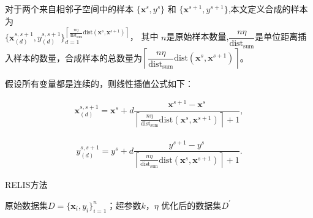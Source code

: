 \documentclass[12pt,a4paper]{article}%
\begin{document}
	对于两个来自相邻子空间中的样本 $\{\boldsymbol{x}^s,y^s\}$ 和 $\{\boldsymbol{x}^{s+1},y^{s+1}\}$,本文定义合成的样本为\\
	$\{\boldsymbol{x}_{(d)}^{s,s+1},y_{(d)}^{s,s+1} \}_{d=1}^{\left\lceil \frac{n\eta }{\text{dist}_{\text{sum}}}\text{dist}(\boldsymbol{x}^s,\boldsymbol{x}^{s+1})\right\rceil}$，
	其中 $n$是原始样本数量,$\dfrac{n\eta}{\text{dist}_{\text{sum}}}$是单位距离插入样本的数量，合成样本的总数量为$\left\lceil \dfrac{n\eta}{\text{dist}_{\text{sum}}}\text{dist}(\boldsymbol{x}^s,\boldsymbol{x}^{s+1})\right\rceil$。

	假设所有变量都是连续的，则线性插值公式如下：

	\begin{align}
		\boldsymbol{x}^{s,s+1}_{(d)}=\boldsymbol{x}^s+d\dfrac{\boldsymbol{x}^{s+1}-\boldsymbol{x}^{s}}{\left\lceil \frac{n\eta}{\text{dist}_{\text{sum}}}\text{dist}(\boldsymbol{x}^s,\boldsymbol{x}^{s+1})\right\rceil+1},
		\end{align}

	\begin{align}
		y^{s,s+1}_{(d)}=y^s+d\dfrac{y^{s+1}-y^{s}}{\left\lceil \frac{n\eta}{\text{dist}_{\text{sum}}}\text{dist}(\boldsymbol{x}^s,\boldsymbol{x}^{s+1})\right\rceil+1}.
		\end{align}

		\begin{algorithm}[t!]
			\caption{RELIS方法}
			\label{a3}
			\renewcommand{\algorithmicrequire}{\textbf{输入:}}
			\renewcommand{\algorithmicensure}{\textbf{输出:}}
			\begin{algorithmic}[1]
				\REQUIRE 原始数据集$D=\{\boldsymbol{x}_i,y_i \}_{i=1}^n$；超参数$k$，$\eta$
				\ENSURE 优化后的数据集$D^\prime$
			\end{algorithmic}
		\end{algorithm}
\end{document}

